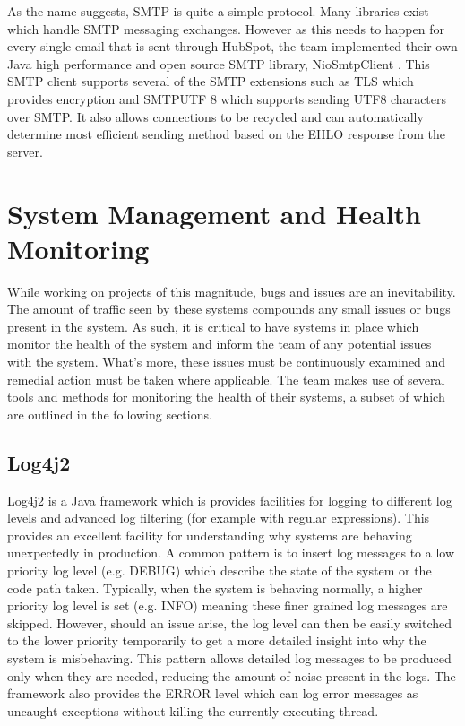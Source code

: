 As the name suggests, SMTP is quite a simple protocol. Many libraries exist which handle SMTP messaging exchanges. However as this needs to happen for every single email that is sent through HubSpot, the \team{} team implemented their own Java high performance and open source SMTP library, NioSmtpClient \cite{hubspotSmtp}. This SMTP client supports several of the SMTP extensions such as TLS which provides encryption and SMTPUTF 8 which supports sending UTF8 characters over SMTP. It also allows connections to be recycled and can automatically determine most efficient sending method based on the EHLO response from the server.     

\section{System Management and Health Monitoring}
While working on projects of this magnitude, bugs and issues are an inevitability. The amount of traffic seen by these systems compounds any small issues or bugs present in the system. As such, it is critical to have systems in place which monitor the health of the system and inform the team of any potential issues with the system. What's more, these issues must be continuously examined and remedial action must be taken where applicable. The \team{} team makes use of several tools and methods for monitoring the health of their systems, a subset of which are outlined in the following sections.

\subsection{Log4j2}\label{sec:log4j2}
Log4j2 \cite{log4j2} is a Java framework which is provides facilities for logging to different log levels and advanced log filtering (for example with regular expressions). This provides an excellent facility for understanding why systems are behaving unexpectedly in production. A common pattern is to insert log messages to a low priority log level (e.g. DEBUG) which describe the state of the system or the code path taken. Typically, when the system is behaving normally, a higher priority log level is set (e.g. INFO) meaning these finer grained log messages are skipped. However, should an issue arise, the log level can then be easily switched to the lower priority temporarily to get a more detailed insight into why the system is misbehaving. This pattern allows detailed log messages to be produced only when they are needed, reducing the amount of noise present in the logs. The framework also provides the ERROR level which can log error messages as uncaught exceptions without killing the currently executing thread.

